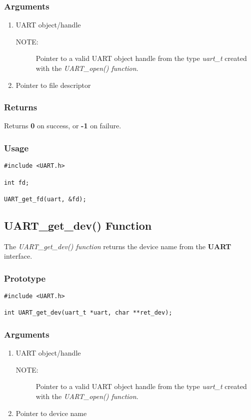 \documentclass{report}
\begin{document}
\subsubsection*{Arguments}
\begin{enumerate}
\item UART object/handle
\begin{description}
\item[NOTE:] Pointer to a valid UART object handle from the type \textit{uart\_t}
created with the \textit{UART\_open() function}.
\end{description}
\item Pointer to file descriptor
\end{enumerate}
\subsubsection*{Returns}
Returns \textbf{0} on success, or \textbf{-1} on failure.
\subsubsection*{Usage}
\begin{lstlisting}
#include <UART.h>

int fd;

UART_get_fd(uart, &fd);
\end{lstlisting}
\subsection{UART\_get\_dev() Function}
The \textit{UART\_get\_dev() function} returns the device
name from the \textbf{UART} interface.
\subsubsection*{Prototype}
\begin{lstlisting}
#include <UART.h>

int UART_get_dev(uart_t *uart, char **ret_dev);
\end{lstlisting}
\subsubsection*{Arguments}
\begin{enumerate}
\item UART object/handle
\begin{description}
\item[NOTE:] Pointer to a valid UART object handle from the type \textit{uart\_t}
created with the \textit{UART\_open() function}.
\end{description}
\item Pointer to device name
\end{enumerate}
\end{document}
